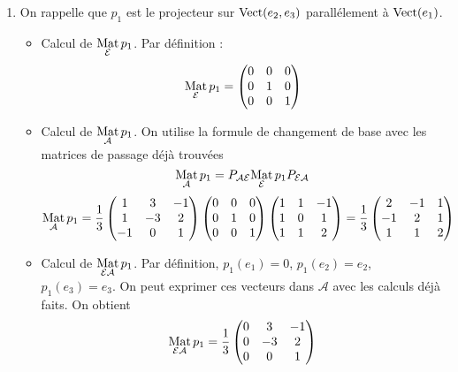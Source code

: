 \begin{enumerate}
\item On rappelle que $p_1$ est le projecteur sur $\operatorname{Vect} (e_2,e_3)$ parallélement à $\operatorname{Vect} (e_1)$.
\begin{itemize}
 \item Calcul de $\underset{\mathcal{E}}{\operatorname{Mat}}\, p_1$. 
Par définition :
\begin{displaymath}
 \underset{\mathcal{E}}{\operatorname{Mat}}\, p_1=
\begin{pmatrix}
0 & 0 & 0 \\
0 & 1 & 0 \\
0 & 0 & 1
\end{pmatrix}
\end{displaymath}

\item Calcul de $\underset{\mathcal{A}}{\operatorname{Mat}}\, p_1$. 
On utilise la formule de changement de base avec les matrices de passage déjà trouvées
\begin{displaymath}
 \underset{\mathcal{A}}{\operatorname{Mat}}\, p_1 =
 P_{\mathcal A \mathcal E}\underset{\mathcal{E}}{\operatorname{Mat}}\, p_1 P_{ \mathcal E \mathcal A}
\end{displaymath}
\begin{displaymath}
\underset{\mathcal{A}}{\operatorname{Mat}}\, p_1 =
\frac{1}{3}
\begin{pmatrix}
 1& 3 & -1 \\
1& -3 & 2 \\
-1 & 0 & 1
\end{pmatrix}
\begin{pmatrix}
0 & 0 & 0 \\
0 & 1 & 0 \\
0 & 0 & 1
\end{pmatrix}
\begin{pmatrix}
1 & 1 & -1 \\
1 & 0 & 1 \\
1 & 1 & 2
\end{pmatrix} 
=
\frac{1}{3}
\begin{pmatrix}
 2 & -1 & 1 \\
-1 & 2  & 1 \\
 1 & 1 & 2
\end{pmatrix}
\end{displaymath}

\item Calcul de $\underset{\mathcal{E A}}{\operatorname{Mat}}\, p_1$. Par définition, $p_1(e_1)=0$, $p_1(e_2)=e_2$, $p_1(e_3)=e_3$. On peut exprimer ces vecteurs dans $\mathcal
A$ avec les calculs déjà faits. On obtient
\begin{displaymath}
\underset{\mathcal{E A}}{\operatorname{Mat}}\, p_1 = 
\frac{1}{3}
\begin{pmatrix}
 0 & 3 & -1 \\
0 & -3  & 2 \\
 0 & 0 & 1
\end{pmatrix}
\end{displaymath}


\end{itemize}
\end{enumerate}
